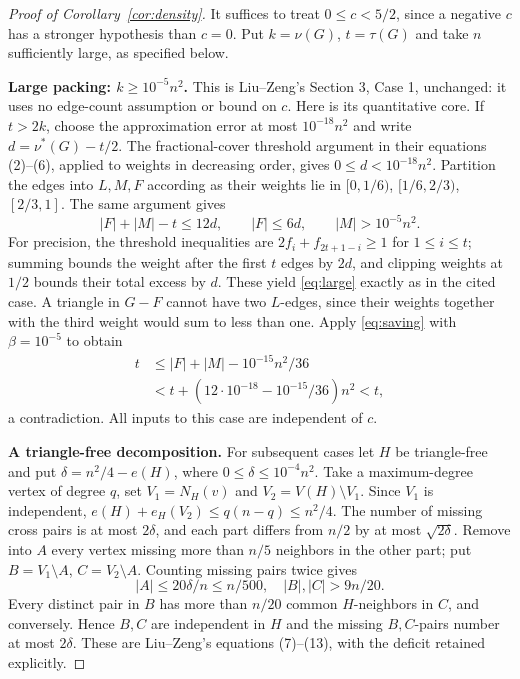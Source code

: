 \documentclass[11pt]{article}
\theoremstyle{definition}\newtheorem{definition}[theorem]{Definition}
\theoremstyle{remark}\newtheorem{remark}[theorem]{Remark}
\begin{document}
\begin{proof}[Proof of Corollary~\ref{cor:density}]\leavevmode
It suffices to treat $0\le c<5/2$, since a negative $c$ has a stronger
hypothesis than $c=0$. Put $k=\nu(G)$, $t=\tau(G)$ and take $n$
sufficiently large, as specified below.

\par\medskip\noindent\textbf{Large packing: $k\ge10^{-5}n^2$.}
This is Liu--Zeng's Section 3, Case 1, unchanged: it uses no edge-count
assumption or bound on $c$. Here is its quantitative core. If $t>2k$,
choose the approximation error at most $10^{-18}n^2$ and write
$d=\nu^*(G)-t/2$. The fractional-cover threshold argument in their
equations (2)--(6), applied to weights in decreasing order, gives
$0\le d<10^{-18}n^2$. Partition the edges into $L,M,F$ according as
their weights lie in $[0,1/6)$, $[1/6,2/3)$, $[2/3,1]$. The same
argument gives
\begin{equation}\label{eq:large}
|F|+|M|-t\le12d,\qquad |F|\le6d,\qquad |M|>10^{-5}n^2.
\end{equation}
For precision, the threshold inequalities are
$2f_i+f_{2t+1-i}\ge1$ for $1\le i\le t$; summing bounds the weight
after the first $t$ edges by $2d$, and clipping weights at $1/2$ bounds
their total excess by $d$. These yield \eqref{eq:large} exactly as in
the cited case. A triangle in $G-F$ cannot have two $L$-edges, since
their weights together with the third weight would sum to less than one.
Apply \eqref{eq:saving} with $\beta=10^{-5}$ to obtain
\begin{equation}\label{eq:contradiction}
\begin{aligned}
t&\le |F|+|M|-10^{-15}n^2/36\\
 &<t+(12\cdot10^{-18}-10^{-15}/36)n^2<t,
\end{aligned}
\end{equation}
a contradiction. All inputs to this case are independent of $c$.

\par\medskip\noindent\textbf{A triangle-free decomposition.}
For subsequent cases let $H$ be triangle-free and put
$\delta=n^2/4-e(H)$, where $0\le\delta\le10^{-4}n^2$.
Take a maximum-degree vertex of degree $q$, set $V_1=N_H(v)$ and
$V_2=V(H)\setminus V_1$. Since $V_1$ is independent,
$e(H)+e_H(V_2)\le q(n-q)\le n^2/4$. The number of missing cross
pairs is at most $2\delta$, and each part differs from $n/2$ by at
most $\sqrt{2\delta}$. Remove into $A$ every vertex missing more
than $n/5$ neighbors in the other part; put $B=V_1\setminus A$,
$C=V_2\setminus A$. Counting missing pairs twice gives
\begin{equation}\label{eq:decomposition}
|A|\le20\delta/n\le n/500,\quad |B|,|C|>9n/20.
\end{equation}
Every distinct pair in $B$ has more than $n/20$ common $H$-neighbors
in $C$, and conversely. Hence $B,C$ are independent in $H$ and the
missing $B,C$-pairs number at most $2\delta$. These are Liu--Zeng's
equations (7)--(13), with the deficit retained explicitly.


\end{proof}
\end{document}
